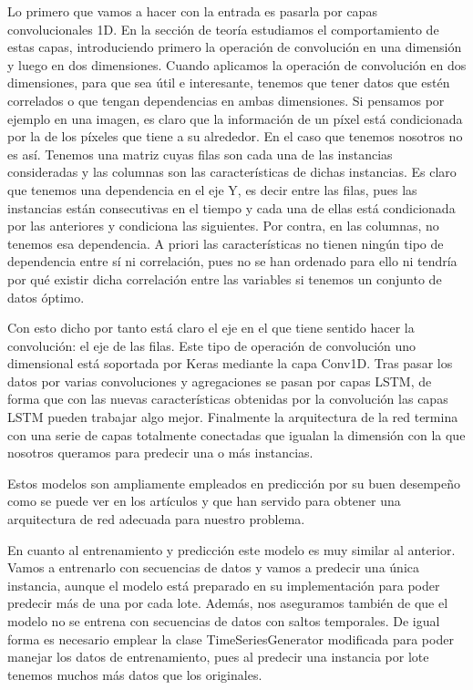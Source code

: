 Lo primero que vamos a hacer con la entrada es pasarla por capas convolucionales 1D. En la sección de teoría estudiamos el comportamiento de estas capas, introduciendo primero la operación de convolución en una dimensión y luego en dos dimensiones. Cuando aplicamos la operación de convolución en dos dimensiones, para que sea útil e interesante, tenemos que tener datos que estén correlados o que tengan dependencias en ambas dimensiones. Si pensamos por ejemplo en una imagen, es claro que la información de un píxel está condicionada por la de los píxeles que tiene a su alrededor. En el caso que tenemos nosotros no es así. Tenemos una matriz cuyas filas son cada una de las instancias consideradas y las columnas son las características de dichas instancias. Es claro que tenemos una dependencia en el eje Y, es decir entre las filas, pues las instancias están consecutivas en el tiempo y cada una de ellas está condicionada por las anteriores y condiciona las siguientes. Por contra, en las columnas, no tenemos esa dependencia. A priori las características no tienen ningún tipo de dependencia entre sí ni correlación, pues no se han ordenado para ello ni tendría por qué existir dicha correlación entre las variables si tenemos un conjunto de datos óptimo.

Con esto dicho por tanto está claro el eje en el que tiene sentido hacer la convolución: el eje de las filas. Este tipo de operación de convolución uno dimensional está soportada por Keras mediante la capa Conv1D. Tras pasar los datos por varias convoluciones y agregaciones se pasan por capas LSTM, de forma que con las nuevas características obtenidas por la convolución las capas LSTM pueden trabajar algo mejor. Finalmente la arquitectura de la red termina con una serie de capas totalmente conectadas que igualan la dimensión con la que nosotros queramos para predecir una o más instancias.

Estos modelos son ampliamente empleados en predicción por su buen desempeño como se puede ver en los artículos \cite{lih_oh_automated_2018} y \cite{tae_young_predicting_2019} que han servido para obtener una arquitectura de red adecuada para nuestro problema.

En cuanto al entrenamiento y predicción este modelo es muy similar al anterior. Vamos a entrenarlo con secuencias de datos y vamos a predecir una única instancia, aunque el modelo está preparado en su implementación para poder predecir más de una por cada lote. Además, nos aseguramos también de que el modelo no se entrena con secuencias de datos con saltos temporales. De igual forma es necesario emplear la clase TimeSeriesGenerator modificada para poder manejar los datos de entrenamiento, pues al predecir una instancia por lote tenemos muchos más datos que los originales.

